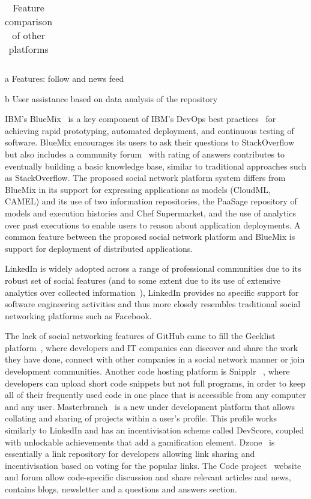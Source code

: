 \begin{table*}
\begin{threeparttable}
\begin{tabular}{c|c|c|c|c|c|c|c|c|c|cc}
\end{tabular}

\begin{tablenotes}
      \small
       \item[a] Features: follow and news feed
      \item[b] User assistance based on data analysis of the repository
\end{tablenotes}
\end{threeparttable}
\caption{Feature comparison of other platforms}\label{tab:related}
\end{table*}

IBM's BlueMix~\cite{Bluemix-dev} is a key component of IBM's DevOps best practices~\cite{ibm-devops} for achieving rapid prototyping, automated deployment, and continuous testing of software. BlueMix encourages its users to ask their questions to StackOverflow but also includes a community forum~\cite{Bluemix-dev} with rating of answers contributes to eventually building a basic knowledge base, similar to traditional approaches such as StackOverflow.  The proposed social network platform system differs from BlueMix in its support for expressing applications as models (CloudML, CAMEL) and its use of two information repositories, the PaaSage repository of models and execution histories and Chef Supermarket, and the use of analytics over past executions to enable users to reason about application deployments. A common feature between the proposed social network platform and BlueMix is support for deployment of distributed applications. 

LinkedIn is widely adopted across a range of professional communities due to its robust set of social features (and to some extent due to its use of extensive analytics over collected information~\cite{sumbaly2013big}), LinkedIn provides no specific support for software engineering activities and thus more closely resembles traditional social networking platforms such as Facebook.

The lack of social networking features of GitHub came to fill the Geeklist platform~\cite{geeklist_url}, where developers and IT companies can discover and share the work they have done, connect with other companies in a social network manner or join development communities. Another code hosting platform is Snipplr ~\cite{snipplr_url}, where developers can upload short code snippets but not full programs, in order to keep all of their frequently used code in one place that is accessible from any computer and any user. Masterbranch~\cite{masterbranch_url} is a new under development platform that allows collating and sharing of projects within a user's profile. This profile works similarly to LinkedIn and has an incentivisation scheme called DevScore, coupled with unlockable achievements that add a gamification element. Dzone~\cite{dzone_url} is essentially a link repository for developers allowing link sharing and incentivisation based on voting for the popular links. The Code project~\cite{codeproject_url} website and forum allow code-specific discussion and share relevant articles and news, contains blogs, newsletter and a questions and answers section.


